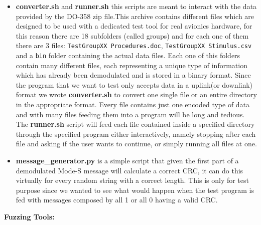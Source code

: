 \documentclass[../main.tex]{subfiles}
\begin{document}
\begin{itemize}

  \item \textbf{converter.sh} and \textbf{runner.sh} this scripts are meant to
  interact with the data provided by the DO-358 zip file.This archive contains
  different files which are designed to be used with a dedicated test tool for
  real  avionics hardware, for  this reason there are 18 subfolders (called
  groups)  and for each one of them  there are 3 files: \texttt{TestGroupXX
  Procedures.doc}, \texttt{TestGroupXX  Stimulus.csv} and a \texttt{bin} folder
  containing the actual data files.  Each one of this folders contain many
  different files,  each representing a unique type of  information which has
  already been  demodulated and is stored in a binary  format. Since the program
  that we want  to test only accepts data in a  uplink(or downlink) format we
  wrote  \textbf{converter.sh} to convert one  single file or an entire
  directory in  the appropriate format. Every file  contains just one encoded
  type of data and  with many files feeding them into a  program will be long
  and tedious. The  \textbf{runner.sh} script will feed each  file contained
  inside a specified  directory through the specified program  either
  interactively, namely stopping  after each file and asking if the user  wants
  to continue, or simply running  all files at one.


  \item \textbf{message\_generator.py} is a simple script that given the first
  part of a demodulated Mode-S message will calculate a correct CRC, it can do
  this virtually for every random string with a correct length. This is only for
  test purpose since we wanted to see what would happen when the test program is
  fed with messages composed by all 1 or all 0 having a valid CRC.

\end{itemize}

\textbf{Fuzzing Tools:}
\end{document}
